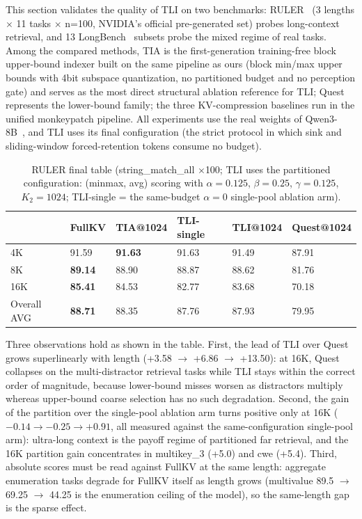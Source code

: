 \documentclass[11pt]{article}
\begin{document}
This section validates the quality of TLI on two benchmarks: RULER~\cite{ruler} (3 lengths $\times$ 11 tasks $\times$ n=100, NVIDIA's official pre-generated set) probes long-context retrieval, and 13 LongBench~\cite{longbench} subsets probe the mixed regime of real tasks. Among the compared methods, TIA is the first-generation training-free block upper-bound indexer built on the same pipeline as ours (block min/max upper bounds with 4bit subspace quantization, no partitioned budget and no perception gate) and serves as the most direct structural ablation reference for TLI; Quest represents the lower-bound family; the three KV-compression baselines run in the unified monkeypatch pipeline. All experiments use the real weights of Qwen3-8B~\cite{qwen3}, and TLI uses its final configuration (the strict protocol in which sink and sliding-window forced-retention tokens consume no budget).

\begin{table}[h]\centering
\caption{RULER final table (string\_match\_all $\times$100; TLI uses the partitioned configuration: (minmax, avg) scoring with $\alpha{=}0.125$, $\beta{=}0.25$, $\gamma{=}0.125$, $K_2{=}1024$; TLI-single = the same-budget $\alpha{=}0$ single-pool ablation arm).}
\begin{tabular}{llllll}
\toprule
 & FullKV & TIA@1024 & TLI-single & TLI@1024 & Quest@1024 \\
\midrule
4K & 91.59 & \textbf{91.63} & 91.63 & 91.49 & 87.91 \\
8K & \textbf{89.14} & 88.90 & 88.87 & 88.62 & 81.76 \\
16K & \textbf{85.41} & 84.53 & 82.77 & 83.68 & 70.18 \\
Overall AVG & \textbf{88.71} & 88.35 & 87.76 & 87.93 & 79.95 \\
\bottomrule
\end{tabular}
\end{table}

Three observations hold as shown in the table. First, the lead of TLI over Quest grows superlinearly with length (+3.58 $\rightarrow$ +6.86 $\rightarrow$ +13.50): at 16K, Quest collapses on the multi-distractor retrieval tasks while TLI stays within the correct order of magnitude, because lower-bound misses worsen as distractors multiply whereas upper-bound coarse selection has no such degradation. Second, the gain of the partition over the single-pool ablation arm turns positive only at 16K ($-0.14 \rightarrow -0.25 \rightarrow +0.91$, all measured against the same-configuration single-pool arm): ultra-long context is the payoff regime of partitioned far retrieval, and the 16K partition gain concentrates in multikey\_3 (+5.0) and cwe (+5.4). Third, absolute scores must be read against FullKV at the same length: aggregate enumeration tasks degrade for FullKV itself as length grows (multivalue 89.5 $\rightarrow$ 69.25 $\rightarrow$ 44.25 is the enumeration ceiling of the model), so the same-length gap is the sparse effect.
\end{document}

